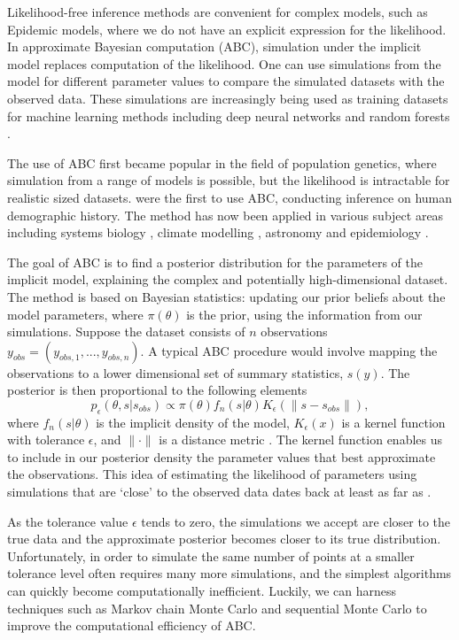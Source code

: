 \documentclass[]{article}
\begin{document}
Likelihood-free inference methods are convenient for complex models, such as Epidemic models, where we do not have an explicit expression for the likelihood. In approximate Bayesian computation (ABC), simulation under the implicit model replaces computation of the likelihood. One can use simulations from the model for different parameter values to compare the simulated datasets with the observed data. These simulations are increasingly being used as training datasets for machine learning methods including deep neural networks \citep{RN6} and random forests \citep{RN8}. 

The use of ABC first became popular in the field of population genetics, where simulation from a range of models is possible, but the likelihood is intractable for realistic sized datasets. \cite{RN57} were the first to use ABC, conducting inference on human demographic history. The method has now been applied in various subject areas including systems biology \citep{RN60}, climate modelling \citep{RN61}, astronomy \citep{RN62} and epidemiology \citep{RN10}.

The goal of ABC is to find a posterior distribution for the parameters of the implicit model, explaining the complex and potentially high-dimensional dataset. The method is based on Bayesian statistics: updating our prior beliefs about the model parameters, where $\pi(\theta)$ is the prior, using the information from our simulations. Suppose the dataset consists of $n$ observations $y_{obs} = (y_{obs,1}, ..., y_{obs,n})$. A typical ABC procedure would involve mapping the observations to a lower dimensional set of summary statistics, $s(y)$. The posterior is then proportional to the following elements
\begin{equation}
p_{\epsilon}(\theta, s|s_{obs}) \propto \pi(\theta)f_n(s|\theta)K_{\epsilon}(\|s - s_{obs}\|),
\end{equation}
where $f_n(s|\theta)$ is the implicit density of the model, $K_{\epsilon}(x)$ is a kernel function with tolerance $\epsilon$, and $\| \cdot \|$ is a distance metric \citep{RN2}. The kernel function enables us to include in our posterior density the parameter values that best approximate the observations. This idea of estimating the likelihood of parameters using simulations that are `close' to the observed data dates back at least as far as \cite{RN56}.

As the tolerance value $\epsilon$ tends to zero, the simulations we accept are closer to the true data and the approximate posterior becomes closer to its true distribution. Unfortunately, in order to simulate the same number of points at a smaller tolerance level often requires many more simulations, and the simplest algorithms can quickly become computationally inefficient. Luckily, we can harness techniques such as Markov chain Monte Carlo \citep{RN17, RN27} and sequential Monte Carlo \citep{RN21, RN30, RN22, RN29} to improve the computational efficiency of ABC.
\end{document}
